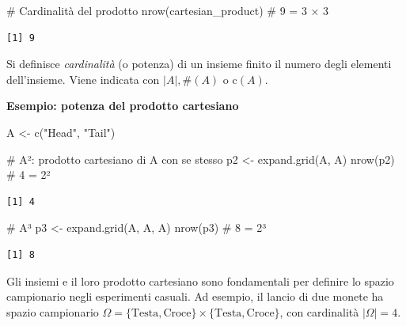 \documentclass[
  italian,
  letterpaper,
  a4paper,
  11pt,
  open=any]{scrbook}
\newenvironment{Shaded}{\begin{snugshade}}{\end{snugshade}}
\newcommand{\CommentTok}[1]{\textcolor[rgb]{0.37,0.37,0.37}{#1}}
\newcommand{\FunctionTok}[1]{\textcolor[rgb]{0.28,0.35,0.67}{#1}}
\newcommand{\NormalTok}[1]{\textcolor[rgb]{0.00,0.23,0.31}{#1}}
\newcommand{\OtherTok}[1]{\textcolor[rgb]{0.00,0.23,0.31}{#1}}
\newcommand{\StringTok}[1]{\textcolor[rgb]{0.13,0.47,0.30}{#1}}
\theoremstyle{plain}
\theoremstyle{definition}
\theoremstyle{definition}
\theoremstyle{remark}
\begin{document}
\begin{Shaded}
\begin{Highlighting}[]
\CommentTok{\# Cardinalità del prodotto}
\FunctionTok{nrow}\NormalTok{(cartesian\_product)  }\CommentTok{\# 9 = 3 × 3}
\end{Highlighting}
\end{Shaded}

\begin{verbatim}
[1] 9
\end{verbatim}

Si definisce \emph{cardinalità} (o potenza) di un insieme finito il
numero degli elementi dell'insieme. Viene indicata con
\(\vert A\vert, \#(A)\) o \(\text{c}(A)\).

\textbf{Esempio: potenza del prodotto cartesiano}

\begin{Shaded}
\begin{Highlighting}[]
\NormalTok{A }\OtherTok{\textless{}{-}} \FunctionTok{c}\NormalTok{(}\StringTok{"Head"}\NormalTok{, }\StringTok{"Tail"}\NormalTok{)}

\CommentTok{\# A²: prodotto cartesiano di A con se stesso}
\NormalTok{p2 }\OtherTok{\textless{}{-}} \FunctionTok{expand.grid}\NormalTok{(A, A)}
\FunctionTok{nrow}\NormalTok{(p2)  }\CommentTok{\# 4 = 2²}
\end{Highlighting}
\end{Shaded}

\begin{verbatim}
[1] 4
\end{verbatim}

\begin{Shaded}
\begin{Highlighting}[]
\CommentTok{\# A³}
\NormalTok{p3 }\OtherTok{\textless{}{-}} \FunctionTok{expand.grid}\NormalTok{(A, A, A)}
\FunctionTok{nrow}\NormalTok{(p3)  }\CommentTok{\# 8 = 2³}
\end{Highlighting}
\end{Shaded}

\begin{verbatim}
[1] 8
\end{verbatim}

\begin{tcolorbox}[enhanced jigsaw, arc=.35mm, bottomrule=.15mm, bottomtitle=1mm, breakable, colback=white, colbacktitle=quarto-callout-note-color!10!white, colframe=quarto-callout-note-color-frame, coltitle=black, left=2mm, leftrule=.75mm, opacityback=0, opacitybacktitle=0.6, rightrule=.15mm, title=\textcolor{quarto-callout-note-color}{\faInfo}\hspace{0.5em}{Collegamento al calcolo delle probabilità}, titlerule=0mm, toprule=.15mm, toptitle=1mm]

Gli insiemi e il loro prodotto cartesiano sono fondamentali per definire
lo spazio campionario negli esperimenti casuali. Ad esempio, il lancio
di due monete ha spazio campionario
\(\Omega = \{\text{Testa}, \text{Croce}\} \times \{\text{Testa}, \text{Croce}\}\),
con cardinalità \(|\Omega| = 4\).

\end{tcolorbox}
\end{document}
